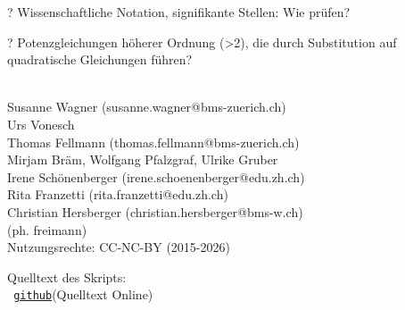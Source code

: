 {? Wissenschaftliche Notation, signifikante Stellen: Wie prüfen?

? Potenzgleichungen höherer Ordnung (>2), die durch Substitution auf
quadratische Gleichungen führen?

\vspace{30mm}
\begin{center}\begin{small} \textbf{ }\\
Susanne Wagner (susanne.wagner@bms-zuerich.ch)\\
Urs Vonesch\\
Thomas Fellmann (thomas.fellmann@bms-zuerich.ch)\\
Mirjam Bräm, Wolfgang Pfalzgraf, Ulrike Gruber\\
Irene Schönenberger (irene.schoenenberger@edu.zh.ch)\\
Rita Franzetti (rita.franzetti@edu.zh.ch)\\
Christian Hersberger (christian.hersberger@bms-w.ch)\\
(ph. freimann)\\
\vspace{2mm}
Nutzungsrechte: CC-NC-BY (2015-2026)

\end{small}%
\end{center}


Quelltext des Skripts:\\
{\small \texttt{
\href{https://github.com/pheek/bbwMathe/tree/main/arbeitsblaetter/GESO_Kompendium}{github}}(Quelltext Online)}


\newpage


\tableofcontents{}
\newpage
\pagestyle{fancy}
}%
